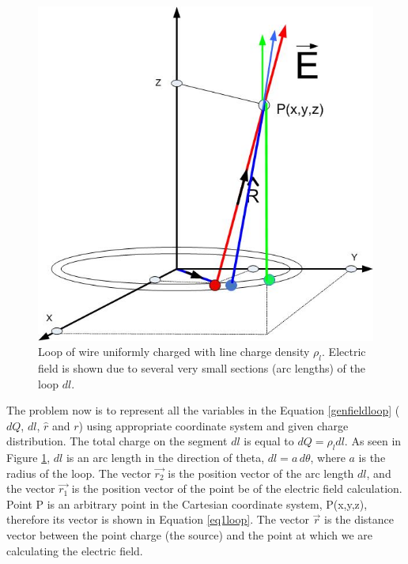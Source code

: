 \documentclass{ximera}
\begin{document}
\begin{figure}[!ht]
\begin{center}
\includegraphics[scale=0.5]{../jpg/ringefieldanywheremorecharges.jpg}
\caption{\label{fig:loopAllPts} Loop of wire uniformly charged with line charge density $\rho_l$. Electric field is shown due to several very small sections (arc lengths) of the loop $dl$.}
\end{center}
\end{figure}

The problem now  is to represent all the variables in the Equation \ref{genfieldloop}  ( $dQ$, $dl$, $\hat{r}$ and $r$) using  appropriate coordinate system and given charge distribution.
The  total charge on the segment $dl$ is equal to $dQ=\rho_l dl$. As seen in Figure \ref{fig:loopAllPts}, $dl$ is an arc length in the direction of theta, $dl=a\, d\theta$, where $ a$ is the radius of the loop. The vector $\vec{r_2}$ is the position vector of the arc length $dl$, and the vector $\vec{r_1}$  is the position vector of the point be of the electric field calculation. Point P is an arbitrary point in the Cartesian coordinate system, P(x,y,z), therefore its vector is shown in Equation \ref{eq1loop}.  The vector $\vec{r}$ is the distance vector between the point charge (the source) and the point at which we are calculating the electric field. 
\end{document}
